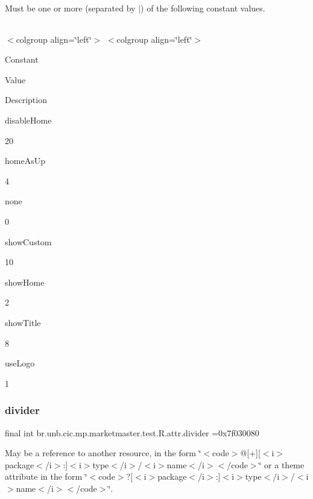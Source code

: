 Must be one or more (separated by \textquotesingle{}$\vert$\textquotesingle{}) of the following constant values.

\tabulinesep=1mm
\begin{longtabu} spread 0pt [c]{*{0}{|X[-1]}|}
\hline
\end{longtabu}
$<$colgroup align=\char`\"{}left\char`\"{}$>$ $<$colgroup align=\char`\"{}left\char`\"{}$>$ 

Constant

Value

Description 

disable\+Home

20

home\+As\+Up

4

none

0

show\+Custom

10

show\+Home

2

show\+Title

8

use\+Logo

1\mbox{\label{classbr_1_1unb_1_1cic_1_1mp_1_1marketmaster_1_1test_1_1R_1_1attr_ad1e6dd11826c8f44be59ecd98c74a0f7}} 
\subsubsection{\texorpdfstring{divider}{divider}}
{\footnotesize\ttfamily final int br.\+unb.\+cic.\+mp.\+marketmaster.\+test.\+R.\+attr.\+divider =0x7f030080\hspace{0.3cm}{\ttfamily [static]}}

May be a reference to another resource, in the form \char`\"{}$<$code$>$@\mbox{[}+\mbox{]}\mbox{[}$<$i$>$package$<$/i$>$\+:\mbox{]}$<$i$>$type$<$/i$>$/$<$i$>$name$<$/i$>$$<$/code$>$\char`\"{} or a theme attribute in the form \char`\"{}$<$code$>$?\mbox{[}$<$i$>$package$<$/i$>$\+:\mbox{]}$<$i$>$type$<$/i$>$/$<$i$>$name$<$/i$>$$<$/code$>$\char`\"{}. \mbox{\label{classbr_1_1unb_1_1cic_1_1mp_1_1marketmaster_1_1test_1_1R_1_1attr_aad44efb04a09f7b612854362c549ddec}} 
